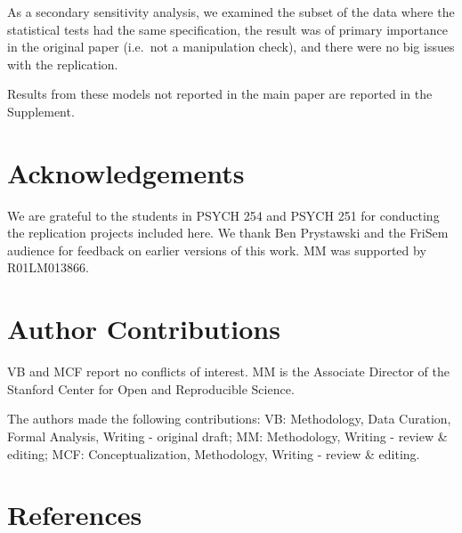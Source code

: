 \documentclass[
  english,
  a4paper,
]{article}
\begin{document}
As a secondary sensitivity analysis, we examined the subset of the data where the statistical tests had the same specification, the result was of primary importance in the original paper (i.e.~not a manipulation check), and there were no big issues with the replication.

Results from these models not reported in the main paper are reported in the Supplement.

\hypertarget{acknowledgements}{%
\section*{Acknowledgements}\label{acknowledgements}}

We are grateful to the students in PSYCH 254 and PSYCH 251 for conducting the replication projects included here. We thank Ben Prystawski and the FriSem audience for feedback on earlier versions of this work. MM was supported by R01LM013866.

\hypertarget{author-contributions}{%
\section*{Author Contributions}\label{author-contributions}}

VB and MCF report no conflicts of interest. MM is the Associate Director of the Stanford Center for Open and Reproducible Science.

The authors made the following contributions: VB: Methodology, Data Curation, Formal Analysis, Writing - original draft;
MM: Methodology, Writing - review \& editing;
MCF: Conceptualization, Methodology, Writing - review \& editing.

\hypertarget{references}{%
\section*{References}\label{references}}
\end{document}

